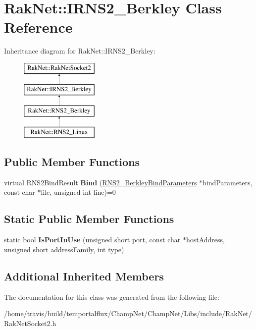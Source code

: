 \hypertarget{class_rak_net_1_1_i_r_n_s2___berkley}{\section{Rak\-Net\-:\-:I\-R\-N\-S2\-\_\-\-Berkley Class Reference}
\label{class_rak_net_1_1_i_r_n_s2___berkley}
}
Inheritance diagram for Rak\-Net\-:\-:I\-R\-N\-S2\-\_\-\-Berkley\-:\begin{figure}[H]
\begin{center}
\leavevmode
\includegraphics[height=4.000000cm]{class_rak_net_1_1_i_r_n_s2___berkley}
\end{center}
\end{figure}
\subsection*{Public Member Functions}
\begin{DoxyCompactItemize}
\item 
\hypertarget{class_rak_net_1_1_i_r_n_s2___berkley_a9612f77280afbee5e41693633b455122}{virtual R\-N\-S2\-Bind\-Result {\bfseries Bind} (\hyperlink{struct_rak_net_1_1_r_n_s2___berkley_bind_parameters}{R\-N\-S2\-\_\-\-Berkley\-Bind\-Parameters} $\ast$bind\-Parameters, const char $\ast$file, unsigned int line)=0}\label{class_rak_net_1_1_i_r_n_s2___berkley_a9612f77280afbee5e41693633b455122}

\end{DoxyCompactItemize}
\subsection*{Static Public Member Functions}
\begin{DoxyCompactItemize}
\item 
\hypertarget{class_rak_net_1_1_i_r_n_s2___berkley_a814d247bea1f8979430e5d38527a3341}{static bool {\bfseries Is\-Port\-In\-Use} (unsigned short port, const char $\ast$host\-Address, unsigned short address\-Family, int type)}\label{class_rak_net_1_1_i_r_n_s2___berkley_a814d247bea1f8979430e5d38527a3341}

\end{DoxyCompactItemize}
\subsection*{Additional Inherited Members}


The documentation for this class was generated from the following file\-:\begin{DoxyCompactItemize}
\item 
/home/travis/build/temportalflux/\-Champ\-Net/\-Champ\-Net/\-Libs/include/\-Rak\-Net/Rak\-Net\-Socket2.\-h\end{DoxyCompactItemize}
